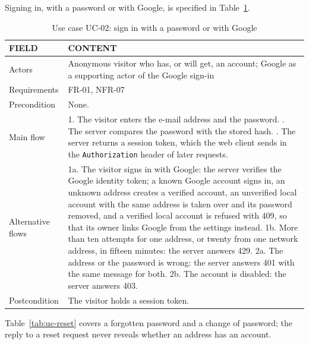 Signing in, with a password or with Google, is specified in Table~\ref{tab:uc-login}.

\begin{table}[H]
\centering
\caption{Use case UC-02: sign in with a password or with Google}
\label{tab:uc-login}
\small
\begin{tabularx}{\textwidth}{p{} X}
\toprule
\textbf{FIELD} & \textbf{CONTENT} \\
\midrule
Actors & Anonymous visitor who has, or will get, an account; Google as a supporting actor of the Google sign-in \\
Requirements & FR-01, NFR-07 \\
Precondition & None. \\
Main flow &
  1. The visitor enters the e-mail address and the password. \newline
  2. The server compares the password with the stored hash. \newline
  3. The server returns a session token, which the web client sends in the \texttt{Authorization} header of later requests. \\
Alternative flows &
  1a. The visitor signs in with Google: the server verifies the Google identity token; a known Google account signs in, an unknown address creates a verified account, an unverified local account with the same address is taken over and its password removed, and a verified local account is refused with 409, so that its owner links Google from the settings instead. \newline
  1b. More than ten attempts for one address, or twenty from one network address, in fifteen minutes: the server answers 429. \newline
  2a. The address or the password is wrong: the server answers 401 with the same message for both. \newline
  2b. The account is disabled: the server answers 403. \\
Postcondition & The visitor holds a session token. \\
\bottomrule
\end{tabularx}
\end{table}

Table~\ref{tab:uc-reset} covers a forgotten password and a change of password; the reply to a
reset request never reveals whether an address has an account.

